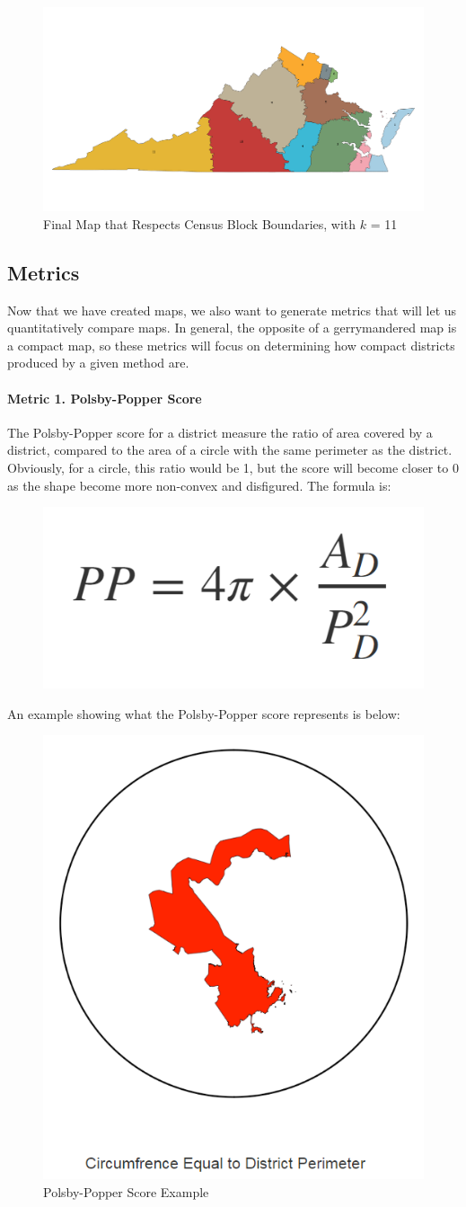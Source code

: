 \documentclass[11pt]{article}
\begin{document}
\begin{figure}[H]
	\centering
	\includegraphics[width=.55\textwidth]{VA_Map_Whole_CB}
	\caption{Final Map that Respects Census Block Boundaries, with $k$ = 11}
	\label{fig:fmap11}
\end{figure}

\subsection{Metrics}

Now that we have created maps, we also want to generate metrics that will let us quantitatively compare maps. In general, the opposite of a gerrymandered map is a compact map, so these metrics will focus on determining how compact districts produced by a given method are.

\paragraph{Metric 1. Polsby-Popper Score}

The Polsby-Popper score for a district measure the ratio of area covered by a district, compared to the area of a circle with the same perimeter as the district\cite{OtherMetrics}. Obviously, for a circle, this ratio would be 1, but the score will become closer to 0 as the shape become more non-convex and disfigured. The formula is:
\begin{figure}[H]
	\centering
	\includegraphics[width=.2\textwidth]{ppeq}
	\label{fig:ppeq}
\end{figure}

An example showing what the Polsby-Popper score represents is below:
\begin{figure}[H]
	\centering
	\includegraphics[width=.55\textwidth]{ppex}
	\caption{Polsby-Popper Score Example}
	\label{fig:ppex}
\end{figure}
\end{document}
